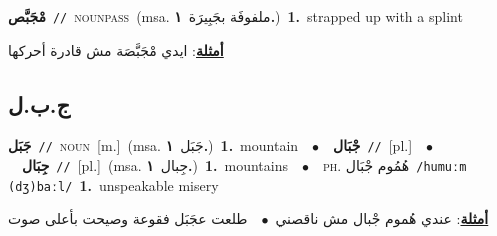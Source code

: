 \documentclass[10pt,a4paper,twoside]{article} %
\begin{document}
\begin{multicols}{2}
{{{\setlength\topsep{0pt}\textbf{\foreignlanguage{arabic}{مْجَبَّص}}\ {\color{gray}\texttt{//}\color{black}}\ \textsc{noun\textunderscore pass}\ \color{gray}(msa. \foreignlanguage{arabic}{ملفوفَة بجَبِيرَة}~\foreignlanguage{arabic}{\textbf{١.}})\color{black}\ \textbf{1.}~strapped up with a splint\  \begin{flushright}\color{gray}\foreignlanguage{arabic}{\textbf{\underline{\foreignlanguage{arabic}{أمثلة}}}: ايدي مْجَبَّصَة مش قادرة أحركها}\end{flushright}\color{black}} \vspace{2mm}

\vspace{-3mm}
\subsection*{\color{blue}\foreignlanguage{arabic}{ج.ب.ل}\color{blue}{}} 

{\setlength\topsep{0pt}\textbf{\foreignlanguage{arabic}{جَبَل}}\ {\color{gray}\texttt{//}\color{black}}\ \textsc{noun}\ [m.]\ \color{gray}(msa. \foreignlanguage{arabic}{جَبَل}~\foreignlanguage{arabic}{\textbf{١.}})\color{black}\ \textbf{1.}~mountain\ \ $\bullet$\ \ \setlength\topsep{0pt}\textbf{\foreignlanguage{arabic}{جْبَال}}\ {\color{gray}\texttt{//}\color{black}}\ [pl.]\ \ $\bullet$\ \ \setlength\topsep{0pt}\textbf{\foreignlanguage{arabic}{جِبَال}}\ {\color{gray}\texttt{//}\color{black}}\ [pl.]\ \color{gray}(msa. \foreignlanguage{arabic}{جِبال}~\foreignlanguage{arabic}{\textbf{١.}})\color{black}\ \textbf{1.}~mountains\ \ $\bullet$\ \ \textsc{ph.} \color{gray} \foreignlanguage{arabic}{هُمُوم جْبَال}\color{black}\ {\color{gray}\texttt{/{\sffamily humuːm (dʒ)baːl}/}\color{black}}\ \textbf{1.}~unspeakable misery\  \begin{flushright}\color{gray}\foreignlanguage{arabic}{\textbf{\underline{\foreignlanguage{arabic}{أمثلة}}}: عندي هُموم جْبال مش ناقصني\ $\bullet$\ \  طلعت عجَبَل فقوعة وصيحت بأعلى صوت}\end{flushright}\color{black}} \vspace{2mm}

}}
\end{multicols}
\end{document}
